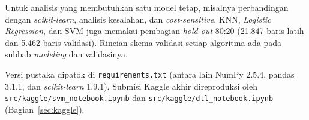 Untuk analisis yang membutuhkan satu model tetap, misalnya perbandingan dengan \textit{scikit-learn},
analisis kesalahan, dan \textit{cost-sensitive}, KNN, \textit{Logistic Regression}, dan SVM juga
memakai pembagian \textit{hold-out} 80:20 (21.847 baris latih dan 5.462 baris validasi). Rincian
skema validasi setiap algoritma ada pada subbab \textit{modeling} dan validasinya.

Versi pustaka dipatok di \nolinkurl{requirements.txt} (antara lain NumPy 2.5.4, pandas 3.1.1, dan
\textit{scikit-learn} 1.9.1). Submisi Kaggle akhir direproduksi oleh
\nolinkurl{src/kaggle/svm_notebook.ipynb} dan \nolinkurl{src/kaggle/dtl_notebook.ipynb}
(Bagian~\ref{sec:kaggle}).
